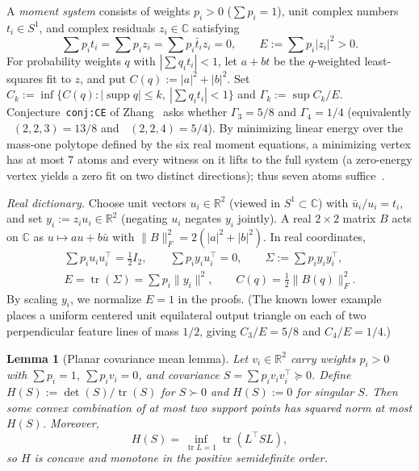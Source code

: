\documentclass[11pt]{article}
\theoremstyle{plain}
\newtheorem{lemma}[theorem]{Lemma}
\theoremstyle{definition}
\theoremstyle{remark}
\DeclareMathOperator{\tr}{tr}
\DeclareMathOperator{\supp}{supp}
\DeclareMathOperator{\Fw}{F_{\mathrm{weighted}}}
\begin{document}
A \emph{moment system} consists of weights $p_i > 0$ ($\sum p_i = 1$), unit complex numbers $t_i \in S^1$, and complex residuals $z_i \in \mathbb{C}$ satisfying
\[
\sum p_i t_i = \sum p_i z_i = \sum p_i \bar{t}_i z_i = 0, \qquad E := \sum p_i |z_i|^2 > 0.
\]
For probability weights $q$ with $|\sum q_i t_i| < 1$, let $a + bt$ be the $q$-weighted least-squares fit to $z$, and put $C(q) := |a|^2 + |b|^2$.
Set $C_k := \inf\{C(q) : |\supp q| \le k,\ |\sum q_i t_i| < 1\}$ and $\Gamma_k := \sup C_k/E$.
Conjecture~\texttt{conj:CE} of Zhang~\cite{Zhang2026} asks whether $\Gamma_3 = 5/8$ and $\Gamma_4 = 1/4$ (equivalently $\Fw(2,2,3) = 13/8$ and $\Fw(2,2,4) = 5/4$).
By minimizing linear energy over the mass-one polytope defined by the six real moment equations, a minimizing vertex has at most $7$ atoms and every witness on it lifts to the full system (a zero-energy vertex yields a zero fit on two distinct directions); thus seven atoms suffice~\cite[Proposition~\texttt{prop:seven}]{Zhang2026}.

\emph{Real dictionary.} Choose unit vectors $u_i \in \mathbb{R}^2$ (viewed in $S^1 \subset \mathbb{C}$) with $\bar{u}_i / u_i = t_i$, and set $y_i := z_i u_i \in \mathbb{R}^2$ (negating $u_i$ negates $y_i$ jointly). A real $2 \times 2$ matrix $B$ acts on $\mathbb{C}$ as $u \mapsto au + b\bar{u}$ with $\|B\|_F^2 = 2(|a|^2 + |b|^2)$. In real coordinates,
\begin{gather*}
\sum p_i u_i u_i^\top = \tfrac{1}{2} I_2, \qquad
\sum p_i y_i u_i^\top = 0, \qquad
\Sigma := \sum p_i y_i y_i^\top, \\
E = \tr(\Sigma) = \sum p_i \|y_i\|^2, \qquad
C(q) = \tfrac{1}{2}\|B(q)\|_F^2.
\end{gather*}
By scaling $y_i$, we normalize $E = 1$ in the proofs. (The known lower example places a uniform centered unit equilateral output triangle on each of two perpendicular feature lines of mass $1/2$, giving $C_3/E = 5/8$ and $C_4/E = 1/4$.)

\begin{lemma}[Planar covariance mean lemma]\label{lem:planar-H}
Let $v_i \in \mathbb{R}^2$ carry weights $p_i > 0$ with $\sum p_i = 1$, $\sum p_i v_i = 0$, and covariance $S = \sum p_i v_i v_i^\top \succeq 0$. Define $H(S) := \det(S)/\tr(S)$ for $S \succ 0$ and $H(S) := 0$ for singular $S$. Then some convex combination of at most two support points has squared norm at most $H(S)$. Moreover,
\[
H(S) = \inf_{\tr L = 1} \tr(L^\top S L),
\]
so $H$ is concave and monotone in the positive semidefinite order.
\end{lemma}
\end{document}
